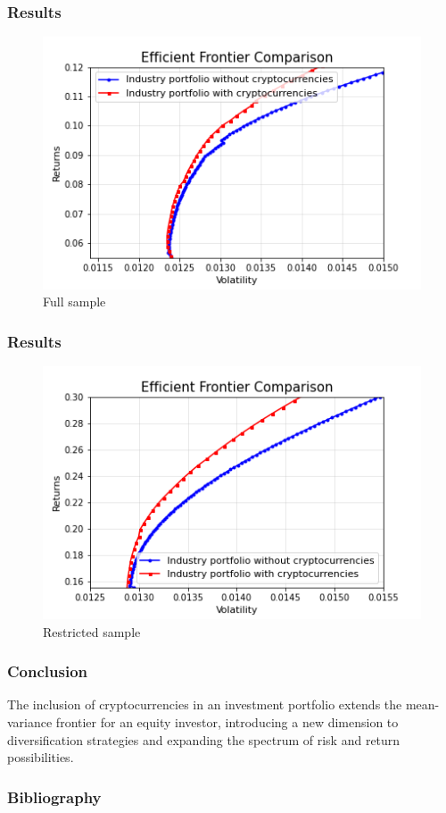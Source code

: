 \documentclass{beamer}
\begin{document}
\begin{frame}
\frametitle{Results}
\begin{figure}
    \centering
    \includegraphics[width=0.8\linewidth]{Figures/Efficient_Frontier_Comparison_Full_Sample.png}
    \caption{Full sample}
    \label{fig:full}
\end{figure}
\end{frame}

\begin{frame}
\frametitle{Results}
\begin{figure}
    \centering
    \includegraphics[width=0.8\linewidth]{Figures/Efficient_Frontier_Comparison_Bull_Market.png}
    \caption{Restricted sample}
    \label{fig:restricted}
\end{figure}
\end{frame}

\begin{frame}
\frametitle{Conclusion}
The inclusion of cryptocurrencies in an investment portfolio extends the mean-variance frontier for an equity investor, introducing a new dimension to diversification strategies and expanding the spectrum of risk and return possibilities. \nocite{wikiref}
\end{frame}

\begin{frame}
\frametitle{Bibliography}



\end{frame}
\end{document}
